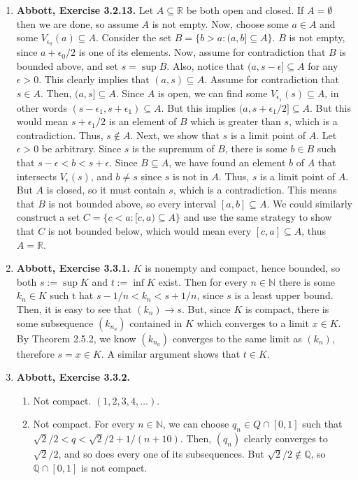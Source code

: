 \documentclass{article}
\newcommand{\N}{\mathbb{N}}
\newcommand{\Q}{\mathbb{Q}}
\newcommand{\R}{\mathbb{R}}
\newcommand{\set}[1]{\{#1\}}
\newcommand{\exc}[2][Abbott]{\item \textbf{#1, Exercise #2.}}
\newcommand{\lep}[1][L]{#1et $\epsilon > 0$ be arbitrary}
\begin{document}
\begin{enumerate}
    \exc{3.2.13}
    Let $A \subseteq \R$ be both open and closed. If $A = \emptyset$ then we are done, so assume $A$ is not empty. Now, choose some $a \in A$ and some $V_{\epsilon_0}(a) \subseteq A$. Consider the set $B = \set{b > a: (a, b] \subseteq A}$. $B$ is not empty, since $a + \epsilon_0/2$ is one of its elements. Now, assume for contradiction that $B$ is bounded above, and set $s = \sup{B}$. Also, notice that $(a, s-\epsilon] \subseteq A$ for any $\epsilon > 0$. This clearly implies that $(a, s) \subseteq A$. Assume for contradiction that $s \in A$. Then, $(a,s] \subseteq A$. Since $A$ is open, we can find some $V_{\epsilon_1}(s) \subseteq A$, in other words $(s-\epsilon_1, s+\epsilon_1) \subseteq A$. But this implies $(a,s+\epsilon_1/2] \subseteq A$. But this would mean $s+\epsilon_1/2$ is an element of $B$ which is greater than $s$, which is a contradiction. Thus, $s \notin A$. Next, we show that $s$ is a limit point of $A$. \lep. Since $s$ is the supremum of $B$, there is some $b \in B$ such that $s-\epsilon < b < s+\epsilon$. Since $B \subseteq A$, we have found an element $b$ of $A$ that intersects $V_\epsilon(s)$, and $b \neq s$ since $s$ is not in $A$. Thus, $s$ is a limit point of $A$. But $A$ is closed, so it must contain $s$, which is a contradiction. This means that $B$ is not bounded above, so every interval $[a, b] \subseteq A$. We could similarly construct a set 
    $C = \set{c < a : [c, a) \subseteq A}$ and use the same strategy to show that $C$ is not bounded below, which would mean every $[c, a] \subseteq A$, thus $A = \R$. 
    
    \exc{3.3.1}
    $K$ is nonempty and compact, hence bounded, so both $s := \sup K$ and $t := \inf K$ exist. Then for every $n \in \N$ there is some $k_n \in K$ such t hat $s - 1/n < k_n < s+1/n$, since $s$ is a least upper bound. Then, it is easy to see that $(k_n) \to s$. But, since $K$ is compact, there is some subsequence $(k_{n_a})$ contained in $K$ which converges to a limit $x \in K$. By Theorem 2.5.2, we know $(k_{n_a})$ converges to the same limit as $(k_n)$, therefore $s = x \in K$. A similar argument shows that $t \in K$.
    
    \exc{3.3.2}
    \begin{enumerate}
        \item Not compact. $(1, 2, 3, 4,\dots)$.
        
        \item Not compact. For every $n \in \N$, we can choose $q_n \in Q \cap [0, 1]$ such that $\sqrt{2}/2 < q < \sqrt{2}/2 + 1/(n+10)$. Then, $(q_n)$ clearly converges to $\sqrt{2}/2$, and so does every one of its subsequences. But $\sqrt{2}/2 \notin \Q$, so $\Q \cap [0, 1]$ is not compact.
        

\end{enumerate}
\end{enumerate}
\end{document}
